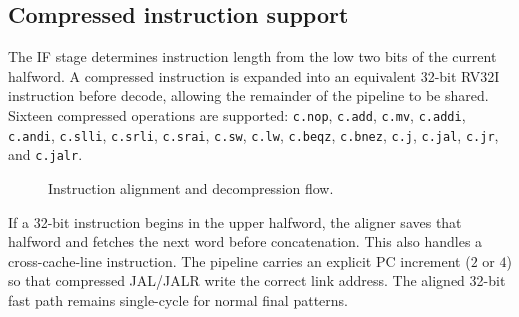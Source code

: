 \documentclass[11pt,a4paper]{article}
\begin{document}
\subsection{Compressed instruction support}
The IF stage determines instruction length from the low two bits of the current
halfword.  A compressed instruction is expanded into an equivalent 32-bit
RV32I instruction before decode, allowing the remainder of the pipeline to be
shared.  Sixteen compressed operations are supported:
\texttt{c.nop}, \texttt{c.add}, \texttt{c.mv}, \texttt{c.addi},
\texttt{c.andi}, \texttt{c.slli}, \texttt{c.srli}, \texttt{c.srai},
\texttt{c.sw}, \texttt{c.lw}, \texttt{c.beqz}, \texttt{c.bnez},
\texttt{c.j}, \texttt{c.jal}, \texttt{c.jr}, and \texttt{c.jalr}.

\begin{figure}[h]
\centering
{}
\caption{Instruction alignment and decompression flow.}
\end{figure}

If a 32-bit instruction begins in the upper halfword, the aligner saves that
halfword and fetches the next word before concatenation.  This also handles a
cross-cache-line instruction.  The pipeline carries an explicit PC increment
(\(2\) or \(4\)) so that compressed JAL/JALR write the correct link address.
The aligned 32-bit fast path remains single-cycle for normal final patterns.
\end{document}
